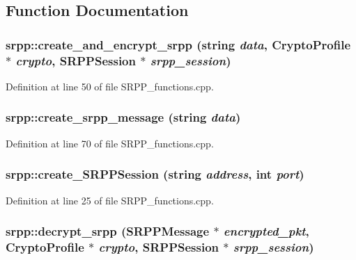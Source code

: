\subsection{Function Documentation}
\hypertarget{namespacesrpp_a4ab1aebaf102fe3b46f250237a4e4f59}{
\subsubsection[{create\_\-and\_\-encrypt\_\-srpp}]{ srpp::create\_\-and\_\-encrypt\_\-srpp (string {\em data}, \/  {\bf CryptoProfile} $\ast$ {\em crypto}, \/  {\bf SRPPSession} $\ast$ {\em srpp\_\-session})}}
\label{namespacesrpp_a4ab1aebaf102fe3b46f250237a4e4f59}


Definition at line 50 of file SRPP\_\-functions.cpp.

\hypertarget{namespacesrpp_ae6f1d8d88738a904e0a72bb93837c60f}{
\subsubsection[{create\_\-srpp\_\-message}]{ srpp::create\_\-srpp\_\-message (string {\em data})}}
\label{namespacesrpp_ae6f1d8d88738a904e0a72bb93837c60f}


Definition at line 70 of file SRPP\_\-functions.cpp.

\hypertarget{namespacesrpp_a8a85c1bdf3b2dbc45b48e485399482a7}{
\subsubsection[{create\_\-SRPPSession}]{ srpp::create\_\-SRPPSession (string {\em address}, \/  int {\em port})}}
\label{namespacesrpp_a8a85c1bdf3b2dbc45b48e485399482a7}


Definition at line 25 of file SRPP\_\-functions.cpp.

\hypertarget{namespacesrpp_a6385520ec7f4bb8c51595b66ad87f5de}{
\subsubsection[{decrypt\_\-srpp}]{ srpp::decrypt\_\-srpp ({\bf SRPPMessage} $\ast$ {\em encrypted\_\-pkt}, \/  {\bf CryptoProfile} $\ast$ {\em crypto}, \/  {\bf SRPPSession} $\ast$ {\em srpp\_\-session})}}
\label{namespacesrpp_a6385520ec7f4bb8c51595b66ad87f5de}


